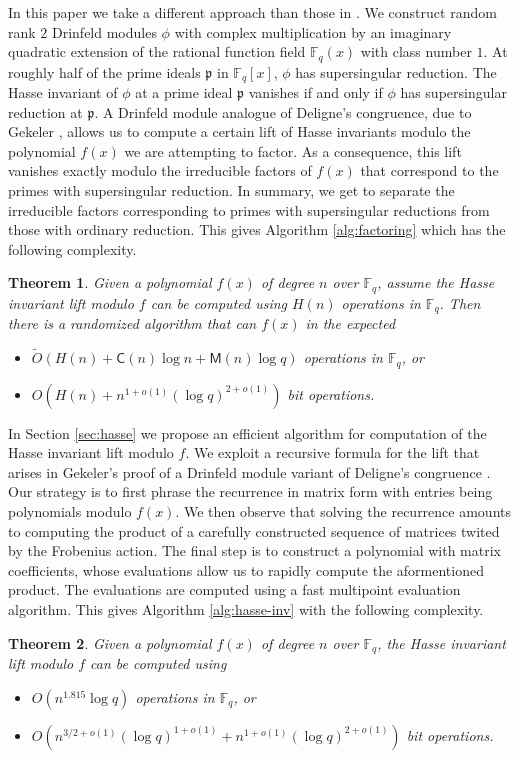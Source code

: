 \documentclass[12pt]{article}
\theoremstyle{plain}
\newtheorem{theorem}{Theorem}
\theoremstyle{definition}
\newcommand{\tildO}{\tilde{O}}
\def\F{\ensuremath{\mathbb{F}}}
\def\MM{\ensuremath{\mathsf{M}}}
\def\CC{\ensuremath{\mathsf{C}}}
\newcommand{\p}{\mathfrak p}
\begin{document}
In this paper we take a different approach than those in \cite{pp,vdH,nar}. We construct random 
rank $2$ Drinfeld modules $\phi$ with complex multiplication by an imaginary quadratic extension of 
the rational function field $\F_q(x)$  with class number $1$. At roughly half of the prime ideals 
$\p$ in $\F_q[x]$, $\phi$ has supersingular reduction. The Hasse invariant of $\phi$ at a prime 
ideal $\p$ vanishes if and only if $\phi$ has supersingular reduction at $\p$. A Drinfeld module 
analogue of Deligne's congruence, due to Gekeler \cite{gek}, allows us to compute a certain lift of 
Hasse invariants modulo the polynomial $f(x)$ we are attempting to factor. As a consequence, this 
lift vanishes exactly modulo the irreducible factors of $f(x)$ that correspond to the primes with 
supersingular reduction. In summary, we get to separate the irreducible factors corresponding to 
primes with supersingular reductions from those with ordinary reduction. This gives Algorithm 
\ref{alg:factoring} which has the following complexity.
\begin{theorem}
	\label{theo:main-factor}
	Given a polynomial $f(x)$ of degree $n$ over $\F_q$, assume the Hasse invariant lift modulo $f$ 
	can be computed using $H(n)$ operations in $\F_q$. Then there is a randomized algorithm that 
	can $f(x)$ in the expected 
	\begin{itemize}
		\item $\tildO(H(n) + \CC(n)\log n + \MM(n)\log q)$ operations in $\F_q$, or
		\item $O(H(n) + n^{1+o(1)}(\log q)^{2+o(1)})$ bit operations.
	\end{itemize}
\end{theorem}

In Section \ref{sec:hasse} we propose an efficient algorithm for computation of the Hasse invariant 
lift modulo $f$. We exploit a recursive formula for the lift that arises in Gekeler's proof of a 
Drinfeld module variant of Deligne's congruence \cite{gek}. Our strategy is to first phrase the 
recurrence in matrix form with entries being polynomials modulo $f(x)$. We then observe that 
solving the recurrence amounts to computing the product of a carefully constructed sequence of 
matrices twited by the Frobenius action. The final step is to construct a polynomial with matrix 
coefficients, whose evaluations allow us to rapidly compute the aformentioned product. The 
evaluations are computed using a fast multipoint evaluation algorithm. This gives Algorithm 
\ref{alg:hasse-inv} with the following complexity.
\begin{theorem}
	\label{theo:main-hasse}
	Given a polynomial $f(x)$ of degree $n$ over $\F_q$, the Hasse invariant lift modulo $f$ can be 
	computed using
	\begin{itemize}
		\item $O(n^{1.815}\log q)$ operations in $\F_q$, or
		\item $O(n^{3/2+o(1)} (\log q)^{1+o(1)} + n^{1+o(1)} (\log q)^{2+o(1)})$ bit operations.
	\end{itemize}
\end{theorem}
\end{document}

